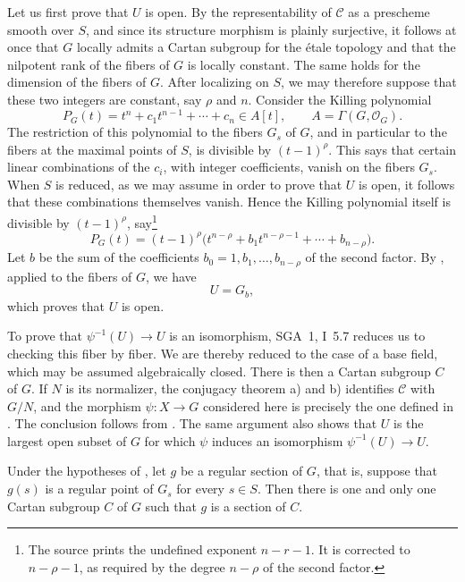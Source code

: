 Let us first prove that \(U\) is open. By the representability of
\(\mathcal C\) as a prescheme smooth over \(S\), and since its
structure morphism is plainly surjective, it follows at once that
\(G\) locally admits a Cartan subgroup for the étale topology and
that the nilpotent rank of the fibers of \(G\) is locally constant.
The same holds for the dimension of the fibers of \(G\). After
localizing on \(S\), we may therefore suppose that these two integers
are constant, say \(\rho\) and \(n\). Consider the Killing polynomial
\[
  P_G(t)=t^n+c_1t^{n-1}+\cdots+c_n\in A[t],
  \qquad A=\Gamma(G,\mathcal O_G).
\]
The restriction of this polynomial to the fibers \(G_s\) of \(G\),
and in particular to the fibers at the maximal points of \(S\), is
divisible by \((t-1)^\rho\). This says that certain linear
combinations of the \(c_i\), with integer coefficients, vanish on the
fibers \(G_s\). When \(S\) is reduced, as we may assume in order to
prove that \(U\) is open, it follows that these combinations
themselves vanish. Hence the Killing polynomial itself is divisible
by \((t-1)^\rho\), say\footnote{The source prints the undefined
exponent \(n-r-1\). It is corrected to \(n-\rho-1\), as required by
the degree \(n-\rho\) of the second factor.}
\[
  P_G(t)
  =
  (t-1)^\rho
  \bigl(t^{n-\rho}+b_1t^{n-\rho-1}+\cdots+b_{n-\rho}\bigr).
\]
Let \(b\) be the sum of the coefficients
\(b_0=1,b_1,\ldots,b_{n-\rho}\) of the second factor. By , applied
to the fibers of \(G\), we have
\[
  U=G_b,
\]
which proves that \(U\) is open.

To prove that \(\psi^{-1}(U)\to U\) is an isomorphism, SGA~1,
I~5.7 reduces us to checking this fiber by fiber. We are thereby
reduced to the case of a base field, which may be assumed
algebraically closed. There is then a Cartan subgroup \(C\) of \(G\).
If \(N\) is its normalizer, the conjugacy theorem  a) and b)
identifies \(\mathcal C\) with \(G/N\), and the morphism
\(\psi:X\to G\) considered here is precisely the one defined in
. The conclusion follows from . The same argument also
shows that \(U\) is the largest open subset of \(G\) for which
\(\psi\) induces an isomorphism \(\psi^{-1}(U)\to U\).

\begin{corollary}
Under the hypotheses of , let \(g\) be a regular section of \(G\),
that is, suppose that \(g(s)\) is a regular point of \(G_s\) for every
\(s\in S\). Then there is one and only one Cartan subgroup \(C\) of
\(G\) such that \(g\) is a section of \(C\).
\end{corollary}

